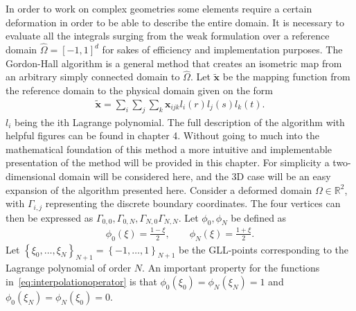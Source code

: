 In order to work on complex geometries some elements require a certain deformation in order to be able 
to describe the entire domain. It is necessary to evaluate all the integrals surging from the weak formulation over 
a reference domain $\hat{\Omega} = [-1,1]^d$ for sakes of efficiency and implementation purposes. The Gordon-Hall 
algorithm is a general method that creates an isometric map from an arbitrary simply connected domain to $\hat{\Omega}$.
Let $\mathbf{\tilde{x}}$ be the mapping function from the reference domain to the physical domain given on the form 
%
\begin{align}
    \mathbf{\tilde{x}}= \sum_i \sum_j \sum_k \mathbf{x}_{ijk}l_i(r) l_j(s) l_k(t).
    \label{eq:mapping}
\end{align}
%
$l_i$ being the ith Lagrange polynomial.
The full description of the algorithm with helpful figures can be found in \cite{Deville} chapter 4.
Without going to much into the mathematical foundation of this method a more intuitive and implementable
presentation of the method will be provided in this chapter. 
For simplicity a two-dimensional domain will be considered here, and the 3D case will be an easy expansion 
of the algorithm presented here. Consider a deformed domain $\Omega \in \mathbb{R}^2$, with $\Gamma_{i,j}$ representing 
the discrete boundary coordinates. The four vertices can then be expressed as 
$\Gamma_{0,0},\Gamma_{0,N},\Gamma_{N,0}\Gamma_{N,N}$. Let $\phi_0,\phi_N$ be defined as 
%
\begin{align}
    \phi_0(\xi) = \frac{1-\xi}{2}, \qquad
    \phi_N(\xi) = \frac{1+\xi}{2}.
    \label{eq:interpolationoperator}
\end{align}
%
Let $\left\{ \xi_0, \ldots ,\xi_N \right\}_{N+1} = \left\{ -1 ,\ldots ,1 \right\}_{N+1}$
be the GLL-points corresponding to the Lagrange polynomial of order $N$. 
An important property for the functions in~\ref{eq:interpolationoperator} is that
$\phi_0(\xi_0) =\phi_N(\xi_N) = 1$ and $\phi_0(\xi_N) =\phi_N(\xi_0) = 0$.

